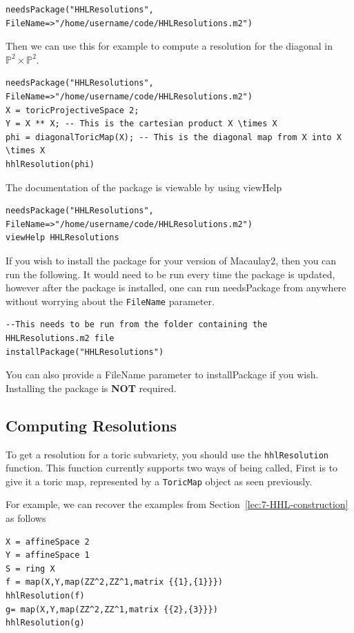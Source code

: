 \documentclass{amsart}
\begin{document}
\begin{verbatim}
needsPackage("HHLResolutions", FileName=>"/home/username/code/HHLResolutions.m2")
\end{verbatim}

Then we can use this for example to compute a resolution for the diagonal in $\mathbb{P}^2\times \mathbb{P}^2$.

\begin{verbatim}
needsPackage("HHLResolutions", FileName=>"/home/username/code/HHLResolutions.m2")
X = toricProjectiveSpace 2;
Y = X ** X; -- This is the cartesian product X \times X
phi = diagonalToricMap(X); -- This is the diagonal map from X into X \times X
hhlResolution(phi)
\end{verbatim}

The documentation of the package is viewable by using viewHelp
\begin{verbatim}
needsPackage("HHLResolutions", FileName=>"/home/username/code/HHLResolutions.m2")
viewHelp HHLResolutions
\end{verbatim}

If you wish to install the package for your version of Macaulay2, then you can run the following. It would need to be run every time the package is updated, however after the package is installed, one can run needsPackage from anywhere without worrying about the \verb|FileName| parameter.
\begin{verbatim}
--This needs to be run from the folder containing the HHLResolutions.m2 file
installPackage("HHLResolutions")
\end{verbatim}
You can also provide a FileName parameter to installPackage if you wish. Installing the package is \textbf{NOT} required.

\subsection{Computing Resolutions}

To get a resolution for a toric subvariety, you should use the \texttt{hhlResolution} function. This function currently supports two ways of being called, First is to give it a toric map, represented by a \texttt{ToricMap} object as seen previously.

For example, we can recover the examples from Section~\ref{lec:7-HHL-construction} as follows
\begin{verbatim}
X = affineSpace 2
Y = affineSpace 1
S = ring X
f = map(X,Y,map(ZZ^2,ZZ^1,matrix {{1},{1}}})
hhlResolution(f)
g= map(X,Y,map(ZZ^2,ZZ^1,matrix {{2},{3}}})
hhlResolution(g)
\end{verbatim}
\end{document}
